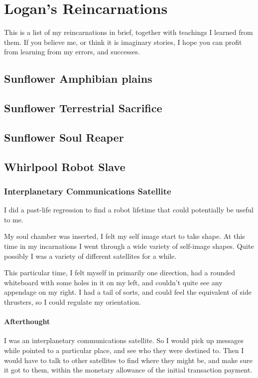 \part{Logan's Reincarnations}\label{reincarnation}

This is a list of my reincarnations in brief, together with teachings I learned
from them. 
If you believe me, or think it is imaginary stories, 
I hope you can profit from learning from my errors, and successes.

\chapter{Sunflower Amphibian plains}

\chapter{Sunflower Terrestrial Sacrifice}
\chapter{Sunflower Soul Reaper}
\chapter{Whirlpool Robot Slave}
\section{Interplanetary Communications Satellite}\label{comsatlife}
I did a past-life regression to find a robot lifetime that could potentially be
useful to me. 

My soul chamber was inserted, I felt my self image start to take shape. 
At this time in my incarnations I went through a wide variety of self-image
shapes. 
Quite possibly I was a variety of different satellites for a while.  

This particular time,  I felt myself in primarily one direction, 
had a rounded whiteboard with some holes in it on my left, and couldn't quite
see any appendage on my right. 
I had a tail of sorts, and could feel the equivalent of side thrusters, so I
could regulate my orientation.  


\subsection{Afterthought}
I was an interplanetary communications satellite. So I would pick up messages
while pointed to a particular place,  and see who they were destined to. Then I
would have to talk to other satellites to find where they might be,  and
make sure it got to them, within the monetary allowance of the initial
transaction payment.  


